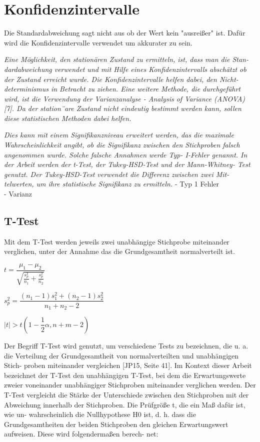 \section{Konfidenzintervalle}
Die Standardabweichung sagt nicht aus ob der Wert kein "ausreißer" ist. Dafür wird die Konfidenzintervalle verwendet
um akkurater zu sein.

\textit{Eine Möglichkeit, den stationären Zustand zu ermitteln, ist, dass man die Stan-
dardabweichung verwendet und mit Hilfe eines Konfidenzintervalls abschätzt ob
der Zustand erreicht wurde. Die Konfidenzintervalle helfen dabei, den Nicht-
determinismus in Betracht zu ziehen. Eine weitere Methode, die durchgeführt
wird, ist die Verwendung der Varianzanalyse - Analysis of Variance (ANOVA)
[7]. Da der station¨are Zustand nicht eindeutig bestimmt werden kann, sollen
diese statistischen Methoden dabei helfen.}

\textit{Dies kann mit einem Signifikanzniveau erweitert werden,
das die maximale Wahrscheinlichkeit angibt, ob die Signifikanz zwischen den
Stichproben falsch angenommen wurde. Solche falsche Annahmen werde Typ-
I-Fehler genannt.
In der Arbeit werden der t-Test, der Tukey-HSD-Test und der Mann-Whitney-
Test genutzt. Der Tukey-HSD-Test verwendet die Differenz zwischen zwei Mit-
telwerten, um ihre statistische Signifikanz zu ermitteln.}
- Typ 1 Fehler \\
- Varianz
\subsection{T-Test}
Mit dem T-Test werden jeweils zwei unabhängige Stichprobe miteinander verglichen, 
unter der Annahme das die Grundgesamtheit normalverteilt ist.

\begin{center}
  $t = \dfrac{\mu_1-\mu_2}{\sqrt{\frac{s_p^2}{n_1} + \frac{s_p^2}{n_2}}}$
\end{center}

\begin{center}
  $s^2_p = \dfrac{(n_1 - 1)s^2_1 + (n_2 - 1)s^2_2}{n_1 + n_2 - 2}$
\end{center}

\begin{center}
  $|t| > t(1 - \dfrac{1}{2}\alpha, n + m - 2)$
\end{center}

Der Begriff T-Test wird genutzt, um verschiedene Tests zu bezeichnen, die
u. a. die Verteilung der Grundgesamtheit von normalverteilten und unabhängigen Stich-
proben miteinander vergleichen [JP15, Seite 41]. Im Kontext dieser Arbeit bezeichnet
der T-Test den unabhängigen T-Test, bei dem die Erwartungswerte zweier voneinander
unabhängiger Stichproben miteinander verglichen werden.
Der T-Test vergleicht die Stärke der Unterschiede zwischen den Stichproben mit der
Abweichung innerhalb der Stichproben. Die Prüfgröße t, die ein Maß dafür ist, wie un-
wahrscheinlich die Nullhypothese H0 ist, d. h. dass die Grundgesamtheiten der beiden
Stichproben den gleichen Erwartungswert aufweisen. Diese wird folgendermaßen berech-
net:

